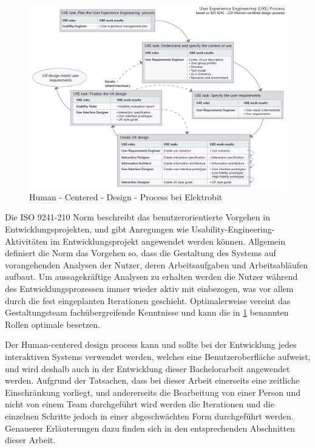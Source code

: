 \begin{figure}[H]
\begin{center}
  \includegraphics[width=\textwidth]{figures/HCD.png}
  \caption{Human - Centered - Design - Process bei Elektrobit}
  \label{fig:HCD}
\end{center}
\end{figure}

Die ISO 9241-210 Norm beschreibt das benutzerorientierte Vorgehen in Entwicklungsprojekten, und gibt Anregungen wie Usability-Engineering-Aktivitäten im Entwicklungsprojekt angewendet werden können.
Allgemein definiert die Norm das Vorgehen so, dass die Gestaltung des Systems auf vorangehenden Analysen der Nutzer, deren Arbeitsaufgaben und Arbeitsabläufen aufbaut.
Um aussagekräftige Analysen zu erhalten werden die Nutzer während des Entwicklungsprozessen immer wieder aktiv mit einbezogen, was vor allem durch die fest eingeplanten Iterationen geschieht.
Optimalerweise vereint das Gestaltungsteam fachübergreifende Kenntnisse und kann die in \cref{fig:HCD} benannten Rollen optimale besetzen\cite{.d}.

Der Human-centered design process kann und sollte bei der Entwicklung jedes interaktiven Systems verwendet werden, welches eine Benutzeroberfläche aufweist, und wird deshalb auch in der Entwicklung dieser Bachelorarbeit angewendet werden.
Aufgrund der Tatsachen, dass bei dieser Arbeit einerseits eine zeitliche Einschränkung vorliegt, und andererseits die Bearbeitung von einer Person und nicht von einem Team durchgeführt wird werden die Iterationen und die einzelnen Schritte jedoch in einer abgeschwächten Form durchgeführt werden. Genauerer Erläuterungen dazu finden sich in den entsprechenden Abschnitten dieser Arbeit.

